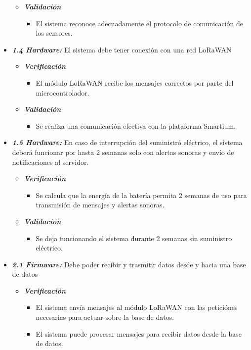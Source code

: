 \documentclass[11pt]{charter}
\begin{document}
\begin{itemize}
\begin{itemize}
		\item \textit{\textbf{Validación}}
		\begin{itemize}
			\item El sistema reconoce adecuadamente el protocolo de comunicación de los sensores.
		\end{itemize}
	\end{itemize}
	
	\item \textit{\textbf{1.4 Hardware:}} El sistema debe tener conexión con una red LoRaWAN
	\begin{itemize}
		\item \textit{ \textbf{Verificación}}
		\begin{itemize}
			\item El módulo LoRaWAN recibe los mensajes correctos por parte del microcontrolador.
		\end{itemize}
		
		\item \textit{\textbf{Validación}}
		\begin{itemize}
			\item Se realiza una comunicación efectiva con la plataforma Smartium.
		\end{itemize}
	\end{itemize}
	
	\item \textit{\textbf{1.5 Hardware:}} En caso de interrupción del suministró eléctrico, el sistema deberá funcionar por hasta 2 semanas solo con alertas sonoras y envío de notificaciones al servidor.
	\begin{itemize}
		\item \textit{ \textbf{Verificación}} 
		\begin{itemize}
			\item Se calcula que la energía de la batería permita 2 semanas de uso para transmisión de mensajes y alertas sonoras.
		\end{itemize}
		
		\item \textit{\textbf{Validación}}
		\begin{itemize}
			\item Se deja funcionando el sistema durante 2 semanas sin suministro eléctrico.
		\end{itemize}
	\end{itemize}

	\item \textit{\textbf{2.1 Firmware:}} Debe poder recibir y trasmitir datos desde y hacia una base de datos
	\begin{itemize}
		\item \textit{ \textbf{Verificación}}
		\begin{itemize}
			\item El sistema envía mensajes al módulo LoRaWAN con las peticiónes necesarias para actuar sobre la base de datos.
			\item El sistema puede procesar mensajes para recibir datos desde la base de datos.
		\end{itemize}
		

\end{itemize}
\end{itemize}
\end{document}
